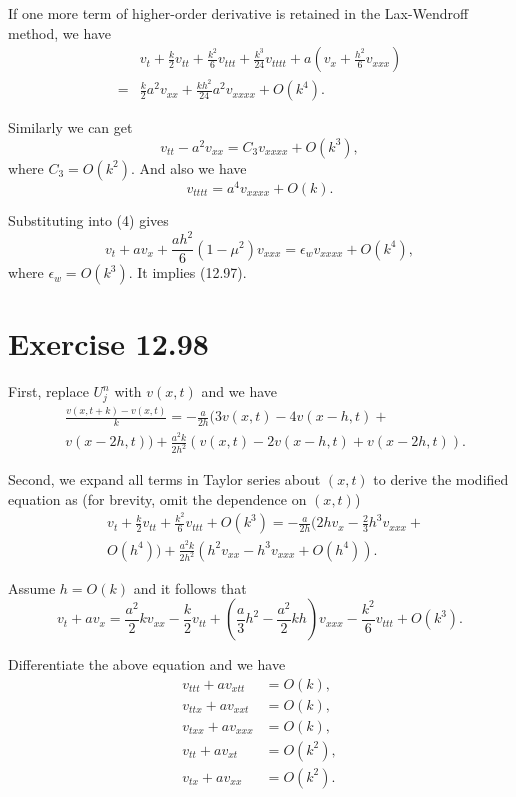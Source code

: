 \documentclass[twocolumn,10pt]{article}
\begin{document}
If one more term of higher-order derivative is retained in the Lax-Wendroff method, we have
\begin{align}
    & v_t+\frac{k}{2}v_{tt}+\frac{k^2}{6}v_{ttt}+\frac{k^3}{24}v_{tttt}+a\left(v_x+\frac{h^2}{6}v_{xxx}\right) \nonumber\\
    =&\frac{k}{2}a^2v_{xx}+\frac{kh^2}{24}a^2v_{xxxx}+O(k^4).
\end{align}

Similarly we can get
\begin{equation*}
    v_{tt}-a^2v_{xx}=C_3v_{xxxx}+O(k^3),
\end{equation*}
where $C_3=O(k^2)$. And also we have
\begin{equation*}
    v_{tttt}=a^4v_{xxxx}+O(k).
\end{equation*}

Substituting into (4) gives
\begin{equation*}
    v_t+av_x+\frac{ah^2}{6}(1-\mu^2)v_{xxx}=\epsilon_w v_{xxxx}+O(k^4),
\end{equation*}
where $\epsilon_w=O(k^3)$. It implies (12.97).

\section*{\large Exercise 12.98}

First, replace $U_j^n$ with $v(x,t)$ and we have
\begin{align*}
    &\frac{v(x,t+k)-v(x,t)}{k}=-\frac{a}{2h}(3v(x,t)-4v(x-h,t)+\\& v(x-2h,t))+\frac{a^2k}{2h^2}(v(x,t)-2v(x-h,t)+v(x-2h,t)).
\end{align*}

Second, we expand all terms in Taylor series about $(x,t)$ to derive the modified equation as (for brevity, omit the dependence on $(x,t)$)
\begin{align*}
    &v_t+\frac{k}{2}v_{tt}+\frac{k^2}{6}v_{ttt}+O(k^3)=-\frac{a}{2h}(2hv_x-\frac{2}{3}h^3v_{xxx}+\\& O(h^4))+\frac{a^2k}{2h^2}(h^2v_{xx}-h^3v_{xxx}+O(h^4)).
\end{align*}

Assume $h=O(k)$ and it follows that
\begin{equation*}
    v_t+av_x=\frac{a^2}{2}kv_{xx}-\frac{k}{2}v_{tt}+(\frac{a}{3}h^2-\frac{a^2}{2}kh)v_{xxx}-\frac{k^2}{6}v_{ttt}+O(k^3).
\end{equation*}

Differentiate the above equation and we have
\begin{align*}
    v_{ttt}+av_{xtt}&=O(k),\\
    v_{ttx}+av_{xxt}&=O(k),\\
    v_{txx}+av_{xxx}&=O(k),\\
    v_{tt}+av_{xt}&=O(k^2),\\
    v_{tx}+av_{xx}&=O(k^2).
\end{align*}
\end{document}
